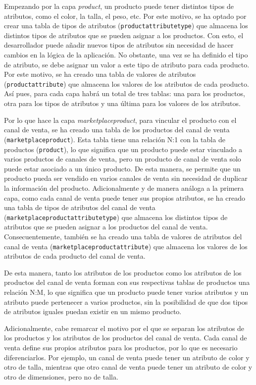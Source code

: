 Empezando por la capa \textit{product}, un producto puede tener distintos tipos de atributos, como el color, la talla, el peso, etc. Por este motivo, se ha optado por crear una tabla de tipos de atributos (\texttt{productattributetype}) que almacena los distintos tipos de atributos que se pueden asignar a los productos. Con esto, el desarrollador puede añadir nuevos tipos de atributos sin necesidad de hacer cambios en la lógica de la aplicación. No obstante, una vez se ha definido el tipo de atributo, se debe asignar un valor a este tipo de atributo para cada producto. Por este motivo, se ha creado una tabla de valores de atributos (\texttt{productattribute}) que almacena los valores de los atributos de cada producto. Así pues, para cada capa habrá un total de tres tablas: una para los productos, otra para los tipos de atributos y una última para los valores de los atributos.

Por lo que hace la capa \textit{marketplaceproduct}, para vincular el producto con el canal de venta, se ha creado una tabla de los productos del canal de venta (\texttt{marketplaceproduct}). Esta tabla tiene una relación N:1 con la tabla de productos (\texttt{product}), lo que significa que un producto puede estar vinculado a varios productos de canales de venta, pero un producto de canal de venta solo puede estar asociado a un único producto. De esta manera, se permite que un producto pueda ser vendido en varios canales de venta sin necesidad de duplicar la información del producto. Adicionalmente y de manera análoga a la primera capa, como cada canal de venta puede tener sus propios atributos, se ha creado una tabla de tipos de atributos del canal de venta (\texttt{marketplaceproductattributetype}) que almacena los distintos tipos de atributos que se pueden asignar a los productos del canal de venta. Consecuentemente, también se ha creado una tabla de valores de atributos del canal de venta (\texttt{marketplaceproductattribute}) que almacena los valores de los atributos de cada producto del canal de venta.

De esta manera, tanto los atributos de los productos como los atributos de los productos del canal de venta forman con sus respectivas tablas de productos una relación N:M, lo que significa que un producto puede tener varios atributos y un atributo puede pertenecer a varios productos, sin la posibilidad de que dos tipos de atributos iguales puedan existir en un mismo producto.

Adicionalmente, cabe remarcar el motivo por el que se separan los atributos de los productos y los atributos de los productos del canal de venta. Cada canal de venta define sus propios atributos para los productos, por lo que es necesario diferenciarlos. Por ejemplo, un canal de venta puede tener un atributo de color y otro de talla, mientras que otro canal de venta puede tener un atributo de color y otro de dimensiones, pero no de talla.

